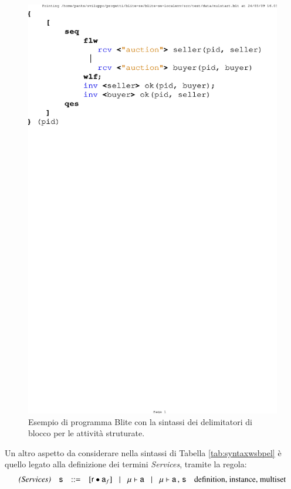 \begin{figure}[!t]
\begin{center}
  \includegraphics[scale=0.80,clip]{linguaggio/dia/blt1}
   \caption[Codice Blite, esempio delimitatori di blocco]{Esempio di programma
   Blite con la sintassi dei delimitatori di blocco per le attività struturate.}
  \label{fig:lin:blt1}
\end{center}
\end{figure}


Un altro aspetto da considerare nella sintassi di Tabella \ref{tab:syntaxwsbpel}
è quello legato alla definizione dei termini \textit{Services}, tramite la
regola:
$$
\begin{array}{rcccl}
\textit{(Services)} & {\sf s} & ::= &
[{\sf r} \bullet {\sf a}_f] \!\quad | \quad\!
{\sf \mu} \vdash {\sf a} \!\quad | \quad\!
{\sf \mu} \vdash {\sf a} \,,\, {\sf s} & \textrm{definition, instance,
multiset}
\end{array}
$$ 


